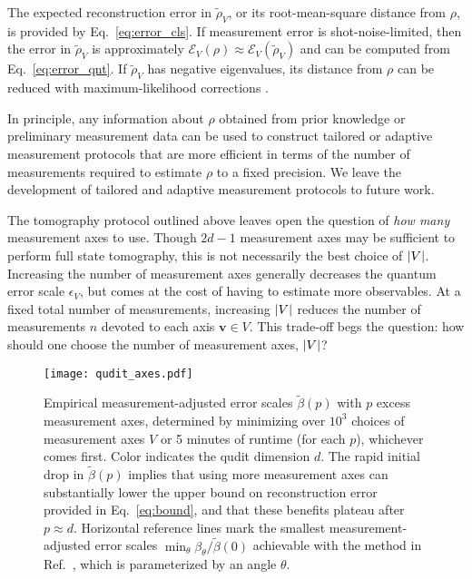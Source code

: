 \documentclass[nofootinbib,twocolumn]{revtex4-1}
\newcommand{\p}[1]{\left(#1\right)} %
\newcommand{\E}{\mathcal{E}}
\begin{document}
The expected reconstruction error in $\tilde\rho_V$, or its root-mean-square distance from $\rho$, is provided by Eq.~\eqref{eq:error_cls}.
If measurement error is shot-noise-limited, then the error in $\tilde\rho_V$ is approximately $\E_V\p{\rho}\approx\E_V\p{\tilde\rho_V}$ and can be computed from Eq.~\eqref{eq:error_qnt}.
If $\tilde\rho_V$ has negative eigenvalues, its distance from $\rho$ can be reduced with maximum-likelihood corrections \cite{smolin2012efficient}.

In principle, any information about $\rho$ obtained from prior knowledge or preliminary measurement data can be used to construct tailored or adaptive measurement protocols \cite{huszar2012adaptive, ferrie2014selfguided, granade2016practical, pereira2018adaptive} that are more efficient in terms of the number of measurements required to estimate $\rho$ to a fixed precision.
We leave the development of tailored and adaptive measurement protocols to future work.

The tomography protocol outlined above leaves open the question of {\it how many} measurement axes to use.
Though $2d-1$ measurement axes may be sufficient to perform full state tomography, this is not necessarily the best choice of $\abs{V}$.
Increasing the number of measurement axes generally decreases the quantum error scale $\epsilon_V$, but comes at the cost of having to estimate more observables.
At a fixed total number of measurements, increasing $\abs{V}$ reduces the number of measurements $n$ devoted to each axis $\bm v\in V$.
This trade-off begs the question: how should one choose the number of measurement axes, $\abs{V}$?

\begin{figure}
  \centering
  \texttt{[image: qudit\_axes.pdf]}
  \caption{Empirical measurement-adjusted error scales $\tilde\beta(p)$ with $p$ excess measurement axes, determined by minimizing over $10^3$ choices of measurement axes $V$ or 5 minutes of runtime (for each $p$), whichever comes first.
    Color indicates the qudit dimension $d$.
    The rapid initial drop in $\tilde\beta(p)$ implies that using more measurement axes can substantially lower the upper bound on reconstruction error provided in Eq.~\eqref{eq:bound}, and that these benefits plateau after $p\approx d$.
    Horizontal reference lines mark the smallest measurement-adjusted error scales $\min_\theta\beta_\theta/\tilde\beta(0)$ achievable with the method in Ref.~\cite{newton1968measurability}, which is parameterized by an angle $\theta$.}
  \label{fig:axes}
\end{figure}
\end{document}
